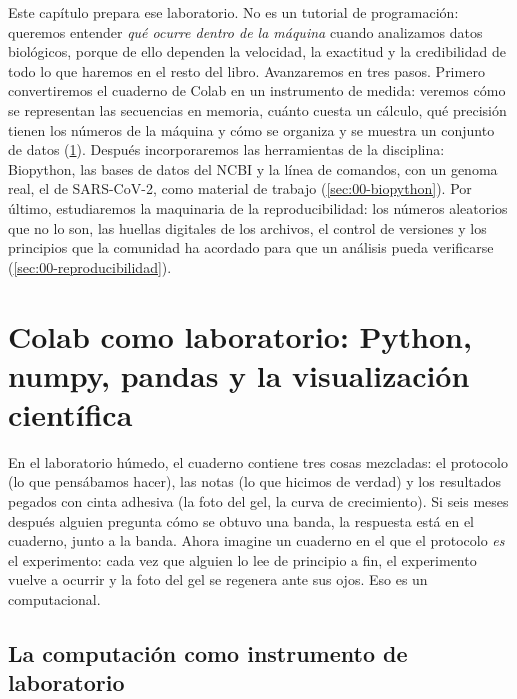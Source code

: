 Este capítulo prepara ese laboratorio. No es un tutorial de programación: queremos entender \emph{qué ocurre dentro de la máquina} cuando analizamos datos biológicos, porque de ello dependen la velocidad, la exactitud y la credibilidad de todo lo que haremos en el resto del libro. Avanzaremos en tres pasos. Primero convertiremos el cuaderno de Colab en un instrumento de medida: veremos cómo se representan las secuencias en memoria, cuánto cuesta un cálculo, qué precisión tienen los números de la máquina y cómo se organiza y se muestra un conjunto de datos (\cref{sec:00-colab}). Después incorporaremos las herramientas de la disciplina: Biopython, las bases de datos del NCBI y la línea de comandos, con un genoma real, el de SARS-CoV-2, como material de trabajo (\cref{sec:00-biopython}). Por último, estudiaremos la maquinaria de la reproducibilidad: los números aleatorios que no lo son, las huellas digitales de los archivos, el control de versiones y los principios que la comunidad ha acordado para que un análisis pueda verificarse (\cref{sec:00-reproducibilidad}).

\section{Colab como laboratorio: Python, numpy, pandas y la visualización científica}\label{sec:00-colab}

\begin{intuicion}
En el laboratorio húmedo, el cuaderno contiene tres cosas mezcladas: el protocolo (lo que pensábamos hacer), las notas (lo que hicimos de verdad) y los resultados pegados con cinta adhesiva (la foto del gel, la curva de crecimiento). Si seis meses después alguien pregunta cómo se obtuvo una banda, la respuesta está en el cuaderno, junto a la banda. Ahora imagine un cuaderno en el que el protocolo \emph{es} el experimento: cada vez que alguien lo lee de principio a fin, el experimento vuelve a ocurrir y la foto del gel se regenera ante sus ojos. Eso es un  computacional.
\end{intuicion}

\subsection{La computación como instrumento de laboratorio}

